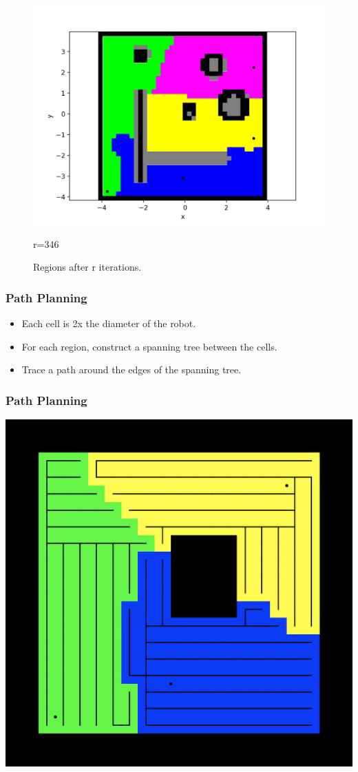 \documentclass{beamer}
\begin{document}
\begin{frame}
\begin{figure}[H]
\begin{minipage}{0.3\textwidth}
    			\includegraphics[width=\linewidth]{DARPImages/346}
    			\caption{r=346}
    		\end{minipage}
		
			\caption{Regions after r iterations.} \label{fig:4pics}
		\end{figure}
	\end{frame}
	\begin{frame}
		\frametitle{Path Planning}
		\begin{itemize}
			\item<2-> Each cell is 2x the diameter of the robot.
			\item<3-> For each region, construct a spanning tree between the cells.
			\item<4-> Trace a path around the edges of the spanning tree.
		\end{itemize}
	\end{frame}
	\begin{frame}
		\frametitle{Path Planning}
		\centering
			\includegraphics[width=0.7\linewidth]{SpanningTreeExample}
	\end{frame}
\end{document}
